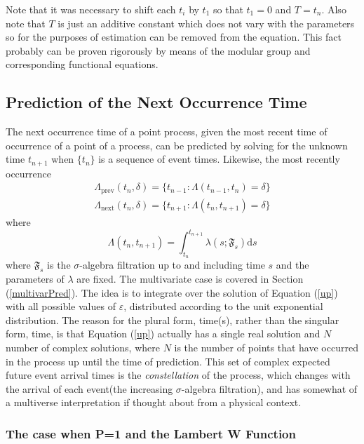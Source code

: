 \documentclass{amsart}
\newcommand{\mathd}{\mathrm{d}}
\newcommand{\tmem}[1]{{\em #1\/}}
\newcommand{\tmop}[1]{\ensuremath{\operatorname{#1}}}
\begin{document}
Note that it was necessary to shift each $t_i$ by $t_1$ so that $t_1 = 0$ and
$T = t_n$. Also note that $T$ is just an additive constant which does not vary
with the parameters so for the purposes of estimation can be removed from the
equation. This fact probably can be proven rigorously by means of the modular
group and corresponding functional equations.

\subsection{Prediction of the Next Occurrence Time}\label{univarPred}

The next occurrence time of a point process, given the most recent time of
occurrence of a point of a process, can be predicted by solving for the
unknown time $t_{n + 1}$ when $\{ t_n \}$ is a sequence of event times.
Likewise, the most recently occurrence
\begin{equation}
  \begin{array}{c}
    \Lambda_{\tmop{prev}} ( t_n, \delta) = \{ t_{n - 1} : \Lambda ( t_{n - 1},
    t_n) = \delta \}\\
    \Lambda_{\tmop{next}} ( t_n, \delta) = \{ t_{n + 1} : \Lambda ( t_n, t_{n
    + 1}) = \delta \}
  \end{array} \label{up}
\end{equation}
where
\begin{equation}
  \Lambda ( t_n, t_{n + 1}) = \int_{t_n}^{t_{n + 1}} \lambda ( s ;
  \mathfrak{F}_s) \mathd s
\end{equation}
where $\mathfrak{F}_s$ is the $\sigma$-algebra filtration up to and including
time $s$ and the parameters of $\lambda$ are fixed. The multivariate case is
covered in Section (\ref{multivarPred}). The idea is to integrate over the
solution of Equation (\ref{up}) with all possible values of $\varepsilon$,
distributed according to the unit exponential distribution. The reason for the
plural form, time(s), rather than the singular form, time, is that Equation
(\ref{up}) actually has a single real solution and $N$ number of complex
solutions, where $N$ is the number of points that have occurred in the process
up until the time of prediction. This set of complex expected future event
arrival times is the {\tmem{constellation}} of the process, which changes with
the arrival of each event(the increasing $\sigma$-algebra filtration), and has
somewhat of a multiverse interpretation if thought about from a physical
context.

\subsubsection{The case when P=1 and the Lambert W Function}
\end{document}

